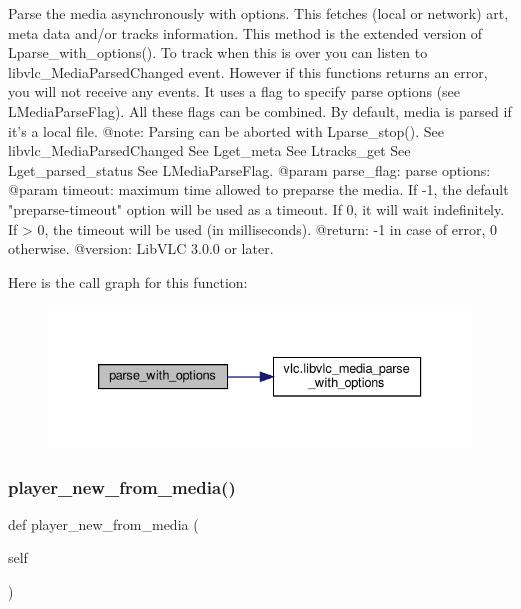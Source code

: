 \begin{DoxyVerb}Parse the media asynchronously with options.
This fetches (local or network) art, meta data and/or tracks information.
This method is the extended version of L{parse_with_options}().
To track when this is over you can listen to libvlc_MediaParsedChanged
event. However if this functions returns an error, you will not receive any
events.
It uses a flag to specify parse options (see L{MediaParseFlag}). All
these flags can be combined. By default, media is parsed if it's a local
file.
@note: Parsing can be aborted with L{parse_stop}().
See libvlc_MediaParsedChanged
See L{get_meta}
See L{tracks_get}
See L{get_parsed_status}
See L{MediaParseFlag}.
@param parse_flag: parse options:
@param timeout: maximum time allowed to preparse the media. If -1, the default "preparse-timeout" option will be used as a timeout. If 0, it will wait indefinitely. If > 0, the timeout will be used (in milliseconds).
@return: -1 in case of error, 0 otherwise.
@version: LibVLC 3.0.0 or later.
\end{DoxyVerb}
 Here is the call graph for this function\+:
\nopagebreak
\begin{figure}[H]
\begin{center}
\leavevmode
\includegraphics[width=333pt]{classvlc_1_1_media_afb65081211e54102a385d0557edea812_cgraph}
\end{center}
\end{figure}
\mbox{\label{classvlc_1_1_media_a6cf2d750b6364dc903552fd0b097cca9}} 
\subsubsection{\texorpdfstring{player\+\_\+new\+\_\+from\+\_\+media()}{player\_new\_from\_media()}}
{\footnotesize\ttfamily def player\+\_\+new\+\_\+from\+\_\+media (\begin{DoxyParamCaption}\item[{}]{self }\end{DoxyParamCaption})}

